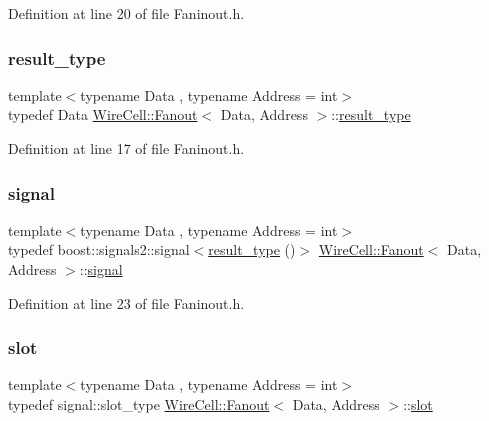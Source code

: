 Definition at line 20 of file Faninout.\+h.

\mbox{\label{class_wire_cell_1_1_fanout_ab2aa0c746557cf71d0454640c91ce0c5}} 
\subsubsection{\texorpdfstring{result\+\_\+type}{result\_type}}
{\footnotesize\ttfamily template$<$typename Data , typename Address  = int$>$ \\
typedef Data \hyperlink{class_wire_cell_1_1_fanout}{Wire\+Cell\+::\+Fanout}$<$ Data, Address $>$\+::\hyperlink{class_wire_cell_1_1_fanout_ab2aa0c746557cf71d0454640c91ce0c5}{result\+\_\+type}}



Definition at line 17 of file Faninout.\+h.

\mbox{\label{class_wire_cell_1_1_fanout_a776717aca6409f33b43c69b4770cd1dd}} 
\subsubsection{\texorpdfstring{signal}{signal}}
{\footnotesize\ttfamily template$<$typename Data , typename Address  = int$>$ \\
typedef boost\+::signals2\+::signal$<$\hyperlink{class_wire_cell_1_1_fanout_ab2aa0c746557cf71d0454640c91ce0c5}{result\+\_\+type} ()$>$ \hyperlink{class_wire_cell_1_1_fanout}{Wire\+Cell\+::\+Fanout}$<$ Data, Address $>$\+::\hyperlink{class_wire_cell_1_1_fanout_a776717aca6409f33b43c69b4770cd1dd}{signal}}



Definition at line 23 of file Faninout.\+h.

\mbox{\label{class_wire_cell_1_1_fanout_aad9b77d911095ea21e611a806ee42d00}} 
\subsubsection{\texorpdfstring{slot}{slot}}
{\footnotesize\ttfamily template$<$typename Data , typename Address  = int$>$ \\
typedef signal\+::slot\+\_\+type \hyperlink{class_wire_cell_1_1_fanout}{Wire\+Cell\+::\+Fanout}$<$ Data, Address $>$\+::\hyperlink{class_wire_cell_1_1_fanout_aad9b77d911095ea21e611a806ee42d00}{slot}}



